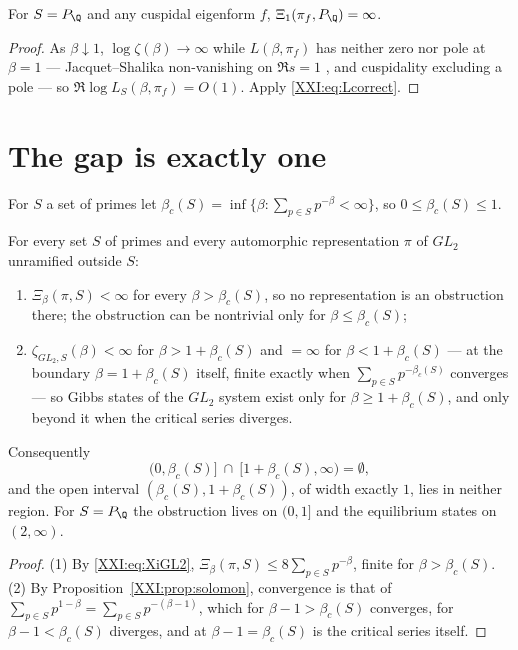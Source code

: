 \begin{corollary}[Divergence at $\beta=1$]\label{XXI:cor:diverge}
For $S=P_\Q$ and any cuspidal eigenform $f$, $\Xi_1(\pi_f,P_\Q)=\infty$.
\end{corollary}

\begin{proof}
As $\beta\downarrow1$, $\log\zeta(\beta)\to\infty$ while $L(\beta,\pi_f)$ has neither zero nor
pole at $\beta=1$ --- Jacquet--Shalika non-vanishing on $\Re s=1$ \cite{JS}, and cuspidality excluding a
pole --- so $\Re\log L_S(\beta,\pi_f)=O(1)$. Apply \eqref{XXI:eq:Lcorrect}.
\end{proof}

\section{The gap is exactly one}

\begin{definition}\label{XXI:def:betac}
For $S$ a set of primes let $\beta_c(S)=\inf\{\beta:\sum_{p\in S}p^{-\beta}<\infty\}$, so
$0\le\beta_c(S)\le1$.
\end{definition}

\begin{theorem}\label{XXI:thm:gap}
For every set $S$ of primes and every automorphic representation $\pi$ of $GL_2$ unramified
outside $S$:
\begin{enumerate}
\item $\Xi_\beta(\pi,S)<\infty$ for every $\beta>\beta_c(S)$, so no representation is an
obstruction there; the obstruction can be nontrivial only for $\beta\le\beta_c(S)$;
\item $\zeta_{GL_2,S}(\beta)<\infty$ for $\beta>1+\beta_c(S)$ and $=\infty$ for
$\beta<1+\beta_c(S)$ --- at the boundary $\beta=1+\beta_c(S)$ itself, finite exactly when
$\sum_{p\in S}p^{-\beta_c(S)}$ converges --- so Gibbs states of
the $GL_2$ system exist only for $\beta\ge1+\beta_c(S)$, and only beyond it when the
critical series diverges.
\end{enumerate}
Consequently
\[
\bigl(0,\beta_c(S)\bigr]\ \cap\ \bigl[1+\beta_c(S),\infty\bigr)=\emptyset ,
\]
and the open interval $(\beta_c(S),1+\beta_c(S))$, of width exactly $1$, lies in neither
region. For $S=P_\Q$ the obstruction lives
on $(0,1]$ and the equilibrium states on $(2,\infty)$.
\end{theorem}

\begin{proof}
(1) By \eqref{XXI:eq:XiGL2}, $\Xi_\beta(\pi,S)\le8\sum_{p\in S}p^{-\beta}$, finite for
$\beta>\beta_c(S)$. (2) By Proposition~\ref{XXI:prop:solomon}, convergence is that of
$\sum_{p\in S}p^{1-\beta}=\sum_{p\in S}p^{-(\beta-1)}$, which for $\beta-1>\beta_c(S)$
converges, for $\beta-1<\beta_c(S)$ diverges, and at $\beta-1=\beta_c(S)$ is the critical
series itself.
\end{proof}

